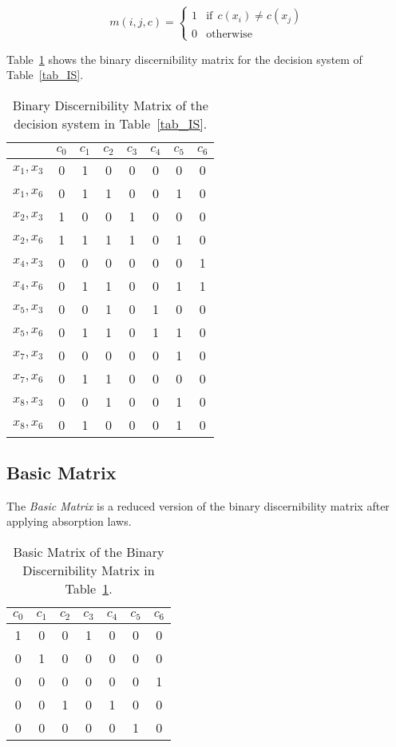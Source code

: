 \documentclass[number,preprint,review,12pt]{elsarticle}
\begin{document}
  \begin{equation}
  	m(i, j, c)=\left\lbrace\begin{array}{cl}
  			1 & \mathrm{if~~}c(x_i) \neq c(x_j) \\
  			0 								   & \mathrm{otherwise} 
  	\end{array}\right.
  \end{equation} 
  
  Table~\ref{tab_BDM} shows the binary discernibility matrix for the decision system of Table~\ref{tab_IS}.  
  
  \begin{table}[htb]
		\caption{Binary Discernibility Matrix of the decision system in Table~\ref{tab_IS}.} \label{tab_BDM}
		\centering
 	\begin{tabular}{c|ccccccc}
 		& $c_0$ & $c_1$ & $c_2$ & $c_3$ & $c_4$ & $c_5$ & $c_6$\\
 		\hline
		$x_1,x_3$ & 0 & 1 & 0 & 0 & 0 & 0 & 0 \\
		$x_1,x_6$ & 0 & 1 & 1 & 0 & 0 & 1 & 0 \\
		$x_2,x_3$ & 1 & 0 & 0 & 1 & 0 & 0 & 0 \\
		$x_2,x_6$ & 1 & 1 & 1 & 1 & 0 & 1 & 0 \\
		$x_4,x_3$ & 0 & 0 & 0 & 0 & 0 & 0 & 1 \\
		$x_4,x_6$ & 0 & 1 & 1 & 0 & 0 & 1 & 1 \\
		$x_5,x_3$ & 0 & 0 & 1 & 0 & 1 & 0 & 0 \\
		$x_5,x_6$ & 0 & 1 & 1 & 0 & 1 & 1 & 0 \\
		$x_7,x_3$ & 0 & 0 & 0 & 0 & 0 & 1 & 0 \\
		$x_7,x_6$ & 0 & 1 & 1 & 0 & 0 & 0 & 0 \\
		$x_8,x_3$ & 0 & 0 & 1 & 0 & 0 & 1 & 0 \\
		$x_8,x_6$ & 0 & 1 & 0 & 0 & 0 & 1 & 0 
 	\end{tabular}             
  \end{table}

\subsection{Basic Matrix}\label{sect_SBDM}
  The \textit{Basic Matrix} is a reduced version of the binary discernibility matrix after applying absorption laws. 
    
  \begin{table}[htb]
	\caption{Basic Matrix of the Binary Discernibility Matrix in Table~\ref{tab_BDM}.}
	\centering
   	\begin{tabular}{ccccccc}\label{tab:SBDM1}
              $c_0$ & $c_1$ & $c_2$ & $c_3$ & $c_4$ & $c_5$ & $c_6$\\
          		\hline
          		1&0&0&1&0&0&0\\
          		0&1&0&0&0&0&0\\
          		0&0&0&0&0&0&1\\
          		0&0&1&0&1&0&0\\
          		0&0&0&0&0&1&0\\
   	\end{tabular}             
  \end{table}  
   
\end{document}
